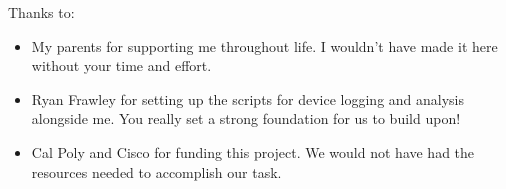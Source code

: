 \noindent
Thanks to:
\begin{itemize}
    \item My parents for supporting me throughout life. I wouldn't have made it here without your time and effort.
    \item Ryan Frawley for setting up the scripts for device logging and analysis alongside me. You really set a strong foundation for us to build upon!
    \item Cal Poly and Cisco for funding this project. We would not have had the resources needed to accomplish our task.
\end{itemize}
